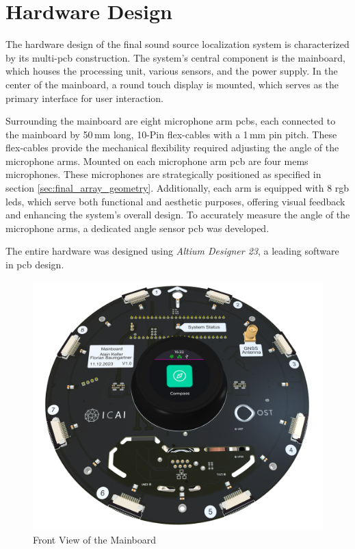 \newpage
\section{Hardware Design}
The hardware design of the final sound source localization system is characterized by its multi-\acrshort{pcb} construction.
The system's central component is the mainboard, which houses the processing unit, various sensors, and the power supply.
In the center of the mainboard, a round touch display is mounted, which serves as the primary interface for user interaction.

Surrounding the mainboard are eight microphone arm \acrshort{pcb}s, each connected to the mainboard by 50\,mm long, 10-Pin flex-cables with a 1\,mm pin pitch.
These flex-cables provide the mechanical flexibility required adjusting the angle of the microphone arms.
Mounted on each microphone arm \acrshort{pcb} are four \acrshort{mems} microphones.
These microphones are strategically positioned as specified in section \ref{sec:final_array_geometry}.
Additionally, each arm is equipped with 8 \acrshort{rgb} \acrshort{led}s, which serve both functional and aesthetic purposes, offering visual feedback and enhancing the system's overall design.
To accurately measure the angle of the microphone arms, a dedicated angle sensor \acrshort{pcb} was developed.

The entire hardware was designed using \textit{Altium Designer 23}, a leading software in \acrshort{pcb} design.
\begin{figure}[h]
	\centering
	\includegraphics[width=1.0\textwidth]{images/6_design_final/Mainboard_Front_Display.png}
	\caption{Front View of the Mainboard}
	\label{fig:mainboard_front}
\end{figure}
\newpage


